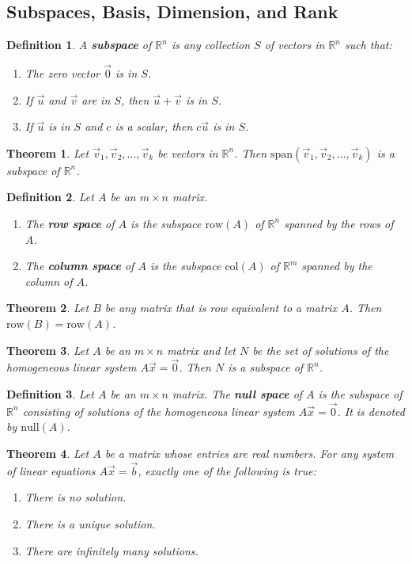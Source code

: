 \documentclass{article}
\theoremstyle{sltheorem}
\newtheorem{definition}{Definition}[section]
\newtheorem{theorem}{Theorem}[section]
\begin{document}
\subsection{Subspaces, Basis, Dimension, and Rank}
\begin{definition}
    A \textbf{subspace} of $\mathbb{R}^n$ is any collection $S$ of vectors in $\mathbb{R}^n$ such that:
    \begin{enumerate}
        \item The zero vector $\vec 0$ is in $S$.
        \item If $\vec u$ and $\vec v$ are in $S$, then $\vec u + \vec v$ is in $S$.
        \item If $\vec u$ is in $S$ and $c$ is a scalar, then $c\vec u$ is in $S$.
    \end{enumerate}
\end{definition}
\begin{theorem}
    Let $\vec v_1, \vec v_2, ..., \vec v_k$ be vectors in $\mathbb{R}^n$. Then $\text{span}(\vec v_1, \vec v_2, ..., \vec v_k)$ is a subspace of $\mathbb{R}^n$.
\end{theorem}
\begin{definition}
    Let $A$ be an $m\times n$ matrix.
    \begin{enumerate}
        \item The \textbf{row space} of $A$ is the subspace $\text{row}(A)$ of $\mathbb{R}^n$ spanned by the rows of $A$.
        \item The \textbf{column space} of $A$ is the subspace $\text{col}(A)$ of $\mathbb{R}^m$ spanned by the column of $A$.
    \end{enumerate}
\end{definition}
\begin{theorem}
    Let $B$ be any matrix that is row equivalent to a matrix $A$. Then $\text{row}(B)=\text{row}(A)$.
\end{theorem}
\begin{theorem}
    Let $A$ be an $m\times n$ matrix and let $N$ be the set of solutions of the homogeneous linear system $A\vec x=\vec 0$. Then $N$ is a subspace of $\mathbb{R}^n$.
\end{theorem}
\begin{definition}
    Let $A$ be an $m\times n$ matrix. The \textbf{null space} of $A$ is the subspace of $\mathbb{R}^n$ consisting of solutions of the homogeneous linear system $A\vec x = \vec 0$. It is denoted by $\text{null}(A)$.
\end{definition}
\begin{theorem}
    Let $A$ be a matrix whose entries are real numbers. For any system of linear equations $A\vec x =\vec b$, exactly one of the following is true:
    \begin{enumerate}
        \item There is no solution.
        \item There is a unique solution.
        \item There are infinitely many solutions.
    \end{enumerate}
\end{theorem}
\end{document}
